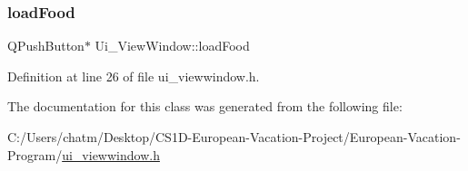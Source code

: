 \subsubsection{\texorpdfstring{loadFood}{loadFood}}
{\footnotesize\ttfamily Q\+Push\+Button$\ast$ Ui\+\_\+\+View\+Window\+::load\+Food}



Definition at line 26 of file ui\+\_\+viewwindow.\+h.



The documentation for this class was generated from the following file\+:\begin{DoxyCompactItemize}
\item 
C\+:/\+Users/chatm/\+Desktop/\+C\+S1\+D-\/\+European-\/\+Vacation-\/\+Project/\+European-\/\+Vacation-\/\+Program/\mbox{\hyperlink{ui__viewwindow_8h}{ui\+\_\+viewwindow.\+h}}\end{DoxyCompactItemize}
